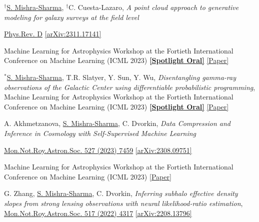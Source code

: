 \documentclass[letterpaper,11pt]{article}
\newenvironment{packed_itemize}{
\begin{itemize}[label=\raisebox{0.25ex}{\tiny$\bullet$}]
  \setlength{\itemsep}{4.2pt}
  \setlength{\parskip}{0pt}
  \setlength{\parsep}{0pt}}{\end{itemize}
}
\newenvironment{packed_enumerate}[1][]{
\begin{etaremune}[#1]
  \setlength{\itemsep}{3.7pt}
  \setlength{\parskip}{0pt}
  \setlength{\parsep}{0pt}}{\end{etaremune}
}
\begin{document}
\begin{packed_enumerate}[start=43]
  \item $^{\dagger}$\underline{S. Mishra-Sharma}, $^{\dagger}$C. Cuesta-Lazaro, \emph{A point cloud approach to generative modeling for galaxy surveys at the field level}
  \begin{packed_itemize}
      \item  \href{https://journals.aps.org/prd/abstract/10.1103/PhysRevD.109.123531}{Phys.Rev. {D}} \href{https://arxiv.org/abs/2311.17141}{[arXiv:2311.17141]}
      \item {Machine Learning for Astrophysics Workshop at the Fortieth International Conference on Machine Learning (ICML 2023)} \href{https://ml4astro.github.io/icml2023/}{\textbf{[Spotlight Oral]}} \href{https://ml4astro.github.io/icml2023/assets/59.pdf}{[Paper]} 
       \end{packed_itemize}

  \item $^*$\underline{S. Mishra-Sharma}, T.R. Slatyer, Y. Sun, Y. Wu, \emph{Disentangling gamma-ray observations of the Galactic Center using differentiable probabilistic programming}, {Machine Learning for Astrophysics Workshop at the Fortieth International Conference on Machine Learning (ICML 2023)} \href{https://ml4astro.github.io/icml2023/}{\textbf{[Spotlight Oral]}} \href{https://ml4astro.github.io/icml2023/assets/52.pdf}{[Paper]}

  \item A. Akhmetzanova, \underline{S. Mishra-Sharma}, C. Dvorkin, \emph{Data Compression and Inference in Cosmology with Self-Supervised Machine Learning}
  \begin{packed_itemize}
      \item \href{https://doi.org/10.1093/mnras/stad3646}{Mon.Not.Roy.Astron.Soc. 527 (2023) 7459} \href{https://arxiv.org/abs/2308.09751}{[arXiv:2308.09751]}
      \item {Machine Learning for Astrophysics Workshop at the Fortieth International Conference on Machine Learning (ICML 2023)} \href{https://ml4astro.github.io/icml2023/assets/11.pdf}{[Paper]} 
       \end{packed_itemize}
      
  \item G. Zhang, \underline{S. Mishra-Sharma}, C. Dvorkin, \emph{Inferring subhalo effective density slopes from strong lensing observations with neural likelihood-ratio estimation}, \href{https://doi.org/10.1093/mnras/stac3014}{Mon.Not.Roy.Astron.Soc. 517 (2022) 4317} \href{https://arxiv.org/abs/2208.13796}{[arXiv:2208.13796]}


\end{packed_enumerate}
\end{document}
